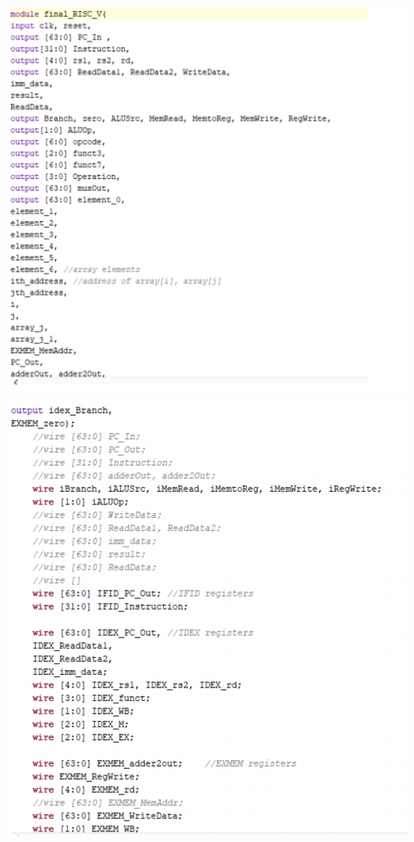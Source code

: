 \documentclass[a4paper, 12pt]{report}
\begin{document}
\\\includegraphics[scale = 0.5]{pipe top 1.png}
\\\includegraphics[scale = 0.5]{pipe top 2.png}
\end{document}
